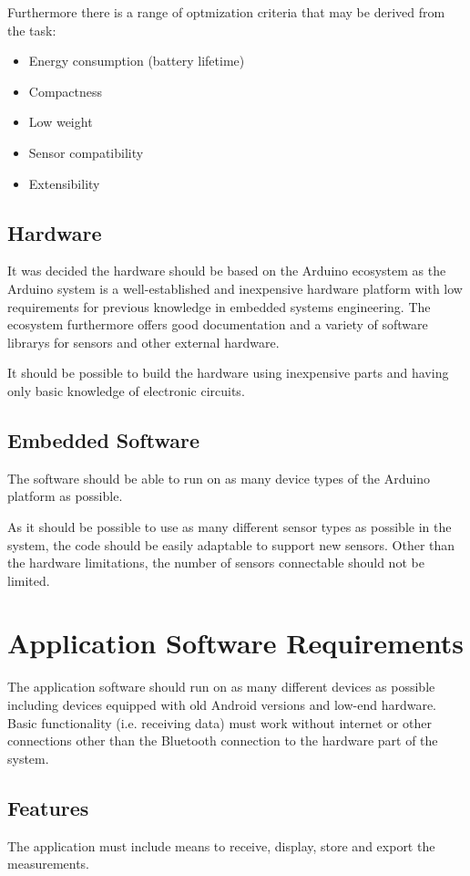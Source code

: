 Furthermore there is a range of optmization criteria that may be derived from the task:
\begin{itemize}
	\item Energy consumption (battery lifetime)
	\item Compactness
	\item Low weight
	\item Sensor compatibility
	\item Extensibility
\end{itemize}

\subsection{Hardware}
It was decided the hardware should be based on the Arduino ecosystem as the Arduino system is a well-established and inexpensive hardware platform with low requirements for previous knowledge in embedded systems engineering. The ecosystem furthermore offers good documentation and a variety of software librarys for sensors and other external hardware.

It should be possible to build the hardware using inexpensive parts and having only basic knowledge of electronic circuits.

\subsection{Embedded Software}
The software should be able to run on as many device types of the Arduino platform as possible.

As it should be possible to use as many different sensor types as possible in the system, the code should be easily adaptable to support new sensors. Other than the hardware limitations, the number of sensors connectable should not be limited.


\section{Application Software Requirements}
The application software should run on as many different devices as possible including devices equipped with old Android versions and low-end hardware. Basic functionality (i.e. receiving data) must work without internet or other connections other than the Bluetooth connection to the hardware part of the system.

\subsection{Features}
The application must include means to receive, display, store and export the measurements.

